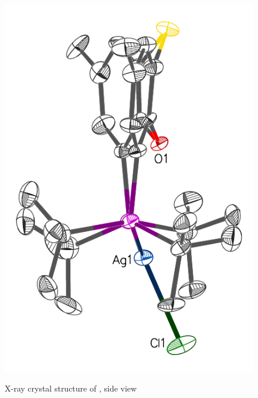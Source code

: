 \begin{figure}[hp]
\begin{center}
\vspace{0.5cm}
\includegraphics[scale=0.8]{../Figures/Crystalthixantphossilverchloridesideview.pdf}
\caption[X-ray crystal structure of , side view]{X-ray crystal structure of , side view}
\vspace{0.2cm}
\label{crystalthixantphossilverchloride:sideview}
\end{center}
\end{figure}
\vspace{0.2cm}

